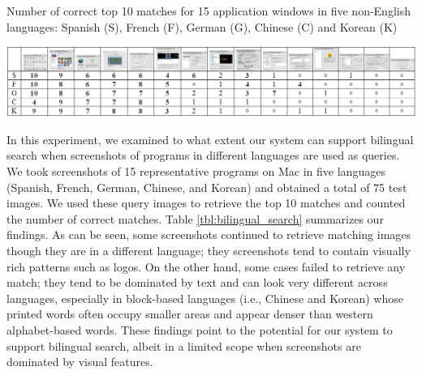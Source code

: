 \documentclass{www2010-submission}
\begin{document}
\begin{table}
  \caption{Number of correct top 10 matches for 15 application windows 
    in five non-English
    languages: Spanish (S), French (F), German (G), Chinese (C) and Korean (K)}
\includegraphics[width=2\columnwidth]{figure/bilingual_search.png}
\label{tbl:bilingual_search}
\end{table}

In this experiment, we examined to what extent our system can support
bilingual search when screenshots of programs in different languages
are used as queries. We took screenshots of 15 representative
programs on Mac in five languages (Spanish, French, German,
Chinese, and Korean) and obtained a total of 75 test
images.  We used these query images to retrieve the top 
10 matches and counted the number of correct matches. 
Table \ref{tbl:bilingual_search} summarizes
our findings. As can be seen, some screenshots continued to retrieve 
matching images though they are in a different language; they screenshots tend 
to contain visually rich patterns such as logos. On the other
hand, some cases failed to retrieve any match; they tend to be
dominated by text and can look very different across languages,
especially in block-based languages (i.e., Chinese and Korean) whose
printed words often occupy smaller areas and appear denser than
western alphabet-based words. These findings point to the potential
for our system to support bilingual search, albeit in a limited
scope when screenshots are dominated by visual features. 





\end{document}
